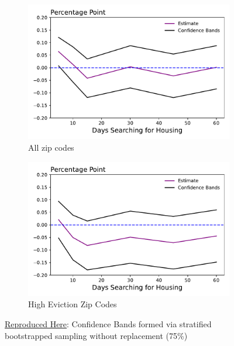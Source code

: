 \documentclass[a4paper,12pt]{article}
\begin{document}
\begin{figure}[htbp]
\centering
\begin{subfigure}{.48\textwidth}
    \centering
    \includegraphics[width=.95\linewidth]{figures/rtc/results/cceh/diff_in_mean_False_False.pdf}
    \caption{All zip codes}
    \label{SUBFIGURE LABEL 3}
\end{subfigure}
\begin{subfigure}{.48\textwidth}
    \centering
    \includegraphics[width=.95\linewidth]{figures/rtc/results/cceh/diff_in_mean_True_False.pdf}
    \caption{High Eviction Zip Codes}
    \label{fig:diff_mean_high}
\end{subfigure}
\caption{ \href{https://github.com/pharringtonp19/evictions/blob/main/scripts/cceh/primary/diff_n_mean_rrh.py}{Reproduced Here}: Confidence Bands formed via stratified bootstrapped sampling without replacement (75\%)}
\label{fig:diff_mean}
\end{figure}
\end{document}
